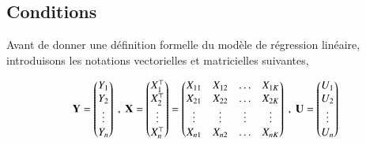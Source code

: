 \documentclass[10pt, reqno]{amsart}
\begin{document}
\subsection{Conditions}
Avant de donner une définition formelle du modèle de régression linéaire, introduisons les notations vectorielles et matricielles suivantes,

\begin{align*}
\mathbf Y=
\begin{pmatrix}
Y_1\\
Y_2\\
\vdots\\
Y_n
\end{pmatrix}
\  , \
\mathbf X=
\begin{pmatrix}
X_1^\top\\
X_2^\top\\
\vdots\\
X_n^\top
\end{pmatrix}
=
\begin{pmatrix}
X_{11} & X_{12}&\ldots&X_{1K}\\
X_{21} & X_{22}&\ldots&X_{2K}\\
\vdots&\vdots&\vdots&\vdots\\
X_{n1} & X_{n2}&\ldots&X_{nK}
\end{pmatrix}
\  , \
\mathbf U=
\begin{pmatrix}
U_1\\
U_2\\
\vdots\\
U_n
\end{pmatrix}
\end{align*}
\end{document}
